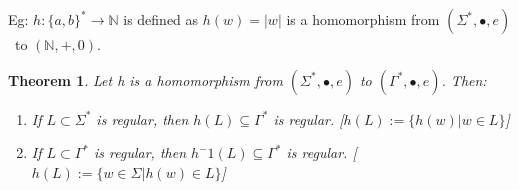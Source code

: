 \documentclass[12pt]{article}
\newtheorem{theorem}{Theorem}
\begin{document}
Eg: $ h : \{a,b{\}}^* \rightarrow \mathbb{N} $ is defined as $ h(w) = |w| $ is a homomorphism from $ (\Sigma^*, \bullet, e) $\ to $(\mathbb{N}, +, 0) $.


\begin{theorem}
   Let h is a homomorphism from $ (\Sigma^*, \bullet, e) $ to $ (\Gamma^*, \bullet, e) $. Then:
   \begin{enumerate}
      \item If $ L \subset \Sigma^* $ is regular, then $ h(L) \subseteq \Gamma^* $ is regular. [$ h(L) := \{ h(w) | w \in L \}$]
      \item If $ L \subset \Gamma^* $ is regular, then $ h^-1(L) \subseteq \Gamma^* $ is regular. [$ h(L) := \{ w \in \Sigma  | h(w)\in L \}$]
   \end{enumerate}

\end{theorem}
\end{document}
